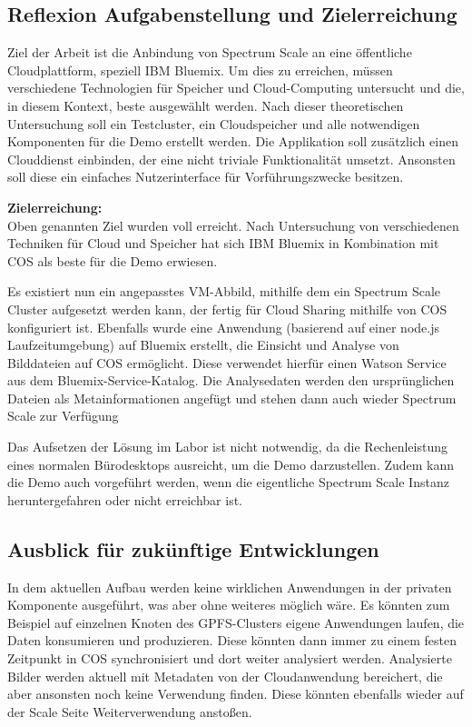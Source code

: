 \subsection{Reflexion Aufgabenstellung und Zielerreichung}

Ziel der Arbeit ist die Anbindung von Spectrum Scale an eine öffentliche Cloudplattform, speziell IBM Bluemix. Um dies zu erreichen, müssen verschiedene Technologien für Speicher und Cloud-Computing untersucht und die, in diesem Kontext, beste ausgewählt werden. Nach dieser theoretischen Untersuchung soll ein Testcluster, ein Cloudspeicher und alle notwendigen Komponenten für die Demo erstellt werden.
Die Applikation soll zusätzlich einen Clouddienst einbinden, der eine nicht triviale Funktionalität umsetzt. Ansonsten soll diese ein einfaches Nutzerinterface für Vorführungszwecke besitzen.

\textbf{Zielerreichung:}\\
Oben genannten Ziel wurden voll erreicht. Nach Untersuchung von verschiedenen Techniken für Cloud und Speicher hat sich IBM Bluemix in Kombination mit \ac{COS} als beste für die Demo erwiesen. 

Es existiert nun ein angepasstes VM-Abbild, mithilfe dem ein Spectrum Scale Cluster aufgesetzt werden kann, der fertig für Cloud Sharing mithilfe von \acl{COS} konfiguriert ist. Ebenfalls wurde eine Anwendung (basierend auf einer node.js Laufzeitumgebung) auf Bluemix erstellt, die Einsicht und Analyse von Bilddateien auf \ac{COS} ermöglicht. Diese verwendet hierfür einen Watson Service aus dem Bluemix-Service-Katalog. Die Analysedaten werden den ursprünglichen Dateien als Metainformationen angefügt und stehen dann auch wieder Spectrum Scale zur Verfügung 

Das Aufsetzen der Lösung im Labor ist nicht notwendig, da die Rechenleistung eines normalen Bürodesktops ausreicht, um die Demo darzustellen. Zudem kann die Demo auch vorgeführt werden, wenn die eigentliche Spectrum Scale Instanz heruntergefahren oder nicht erreichbar ist.

\subsection{Ausblick für zukünftige Entwicklungen}
In dem aktuellen Aufbau werden keine wirklichen Anwendungen in der privaten Komponente ausgeführt, was aber ohne weiteres möglich wäre. Es könnten zum Beispiel auf einzelnen Knoten des GPFS-Clusters eigene Anwendungen laufen, die Daten konsumieren und produzieren. Diese könnten dann immer zu einem festen Zeitpunkt in \ac{COS} synchronisiert und dort weiter analysiert werden.
Analysierte Bilder werden aktuell mit Metadaten von der Cloudanwendung bereichert, die aber ansonsten noch keine Verwendung finden. Diese könnten ebenfalls wieder auf der Scale Seite Weiterverwendung anstoßen. 

